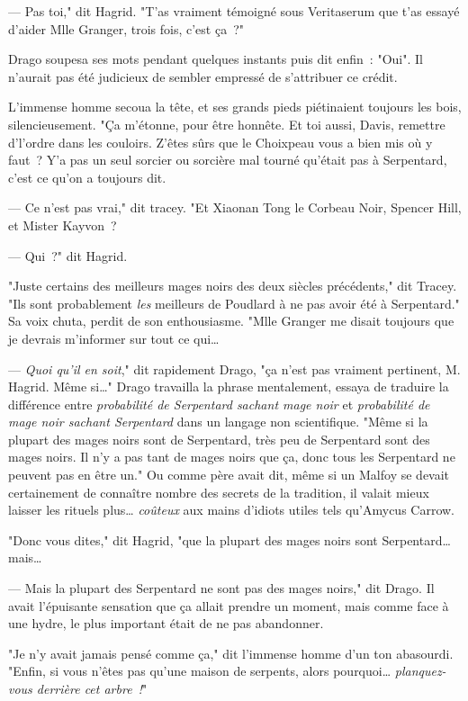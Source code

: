 --- Pas toi," dit Hagrid. "T'as vraiment témoigné sous Veritaserum que t'as essayé d'aider Mlle Granger, trois fois, c'est ça~?"

Drago soupesa ses mots pendant quelques instants puis dit enfin~: "Oui". Il n'aurait pas été judicieux de sembler empressé de s'attribuer ce crédit.

L'immense homme secoua la tête, et ses grands pieds piétinaient toujours les bois, silencieusement. "Ça m'étonne, pour être honnête. Et toi aussi, Davis, remettre d'l'ordre dans les couloirs. Z'êtes sûrs que le Choixpeau vous a bien mis où y faut~? Y'a pas un seul sorcier ou sorcière mal tourné qu'était pas à Serpentard, c'est ce qu'on a toujours dit.

--- Ce n'est pas vrai," dit tracey. "Et Xiaonan Tong le Corbeau Noir, Spencer Hill, et Mister Kayvon~?

--- Qui~?" dit Hagrid.

"Juste certains des meilleurs mages noirs des deux siècles précédents," dit Tracey. "Ils sont probablement \emph{les} meilleurs de Poudlard à ne pas avoir été à Serpentard." Sa voix chuta, perdit de son enthousiasme. "Mlle Granger me disait toujours que je devrais m'informer sur tout ce qui…

--- \emph{Quoi qu'il en soit}," dit rapidement Drago, "ça n'est pas vraiment pertinent, M. Hagrid. Même si…" Drago travailla la phrase mentalement, essaya de traduire la différence entre \emph{probabilité de Serpentard sachant mage noir} et \emph{probabilité de mage noir sachant Serpentard} dans un langage non scientifique. "Même si la plupart des mages noirs sont de Serpentard, très peu de Serpentard sont des mages noirs. Il n'y a pas tant de mages noirs que ça, donc tous les Serpentard ne peuvent pas en être un." Ou comme père avait dit, même si un Malfoy se devait certainement de connaître nombre des secrets de la tradition, il valait mieux laisser les rituels plus… \emph{coûteux} aux mains d'idiots utiles tels qu'Amycus Carrow.

"Donc vous dites," dit Hagrid, "que la plupart des mages noirs sont Serpentard… mais…

--- Mais la plupart des Serpentard ne sont pas des mages noirs," dit Drago. Il avait l'épuisante sensation que ça allait prendre un moment, mais comme face à une hydre, le plus important était de ne pas abandonner.

"Je n'y avait jamais pensé comme ça," dit l'immense homme d'un ton abasourdi. "Enfin, si vous n'êtes pas qu'une maison de serpents, alors pourquoi… \emph{planquez-vous derrière cet arbre~!}"

